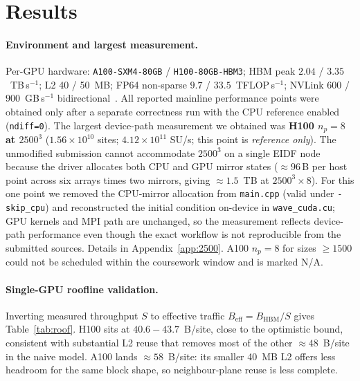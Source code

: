\documentclass[10pt,a4paper]{article}
\begin{document}
\section{Results}
\label{sec:results}

\paragraph{Environment and largest measurement.}
Per-GPU hardware: \texttt{A100-SXM4-80GB} / \texttt{H100-80GB-HBM3}; HBM peak $2.04$ / $3.35$~TB\,s$^{-1}$; L2 40 / 50~MB; FP64 non-sparse $9.7$ / $33.5$~TFLOP\,s$^{-1}$; NVLink $600$ / $900$~GB\,s$^{-1}$ bidirectional~\cite{a100ds,h100ds}. All reported mainline performance points were obtained only after a separate correctness run with the CPU reference enabled (\texttt{ndiff=0}). The largest device-path measurement we obtained was \textbf{H100 $n_p{=}8$ at $2500^3$} ($1.56\!\times\!10^{10}$ sites; $4.12\!\times\!10^{11}$ SU/s; this point is \emph{reference only}). The unmodified submission cannot accommodate $2500^3$ on a single EIDF node because the driver allocates both CPU and GPU mirror states ($\approx 96$\,B per host point across six arrays times two mirrors, giving $\approx 1.5$~TB at $2500^3 \times 8$). For this one point we removed the CPU-mirror allocation from \texttt{main.cpp} (valid under \texttt{-skip\_cpu}) and reconstructed the initial condition on-device in \texttt{wave\_cuda.cu}; GPU kernels and MPI path are unchanged, so the measurement reflects device-path performance even though the exact workflow is not reproducible from the submitted sources. Details in Appendix~\ref{app:2500}. A100 $n_p{=}8$ for sizes $\geq\!1500$ could not be scheduled within the coursework window and is marked N/A.

\paragraph{Single-GPU roofline validation.}
Inverting measured throughput $S$ to effective traffic $B_{\text{eff}}{=}B_{\text{HBM}}/S$ gives Table~\ref{tab:roof}. H100 sits at $40.6\!-\!43.7$~B/site, close to the optimistic bound, consistent with substantial L2 reuse that removes most of the other $\approx\!48$~B/site in the naive model. A100 lands $\approx\!58$~B/site: its smaller 40~MB L2 offers less headroom for the same block shape, so neighbour-plane reuse is less complete.
\end{document}
